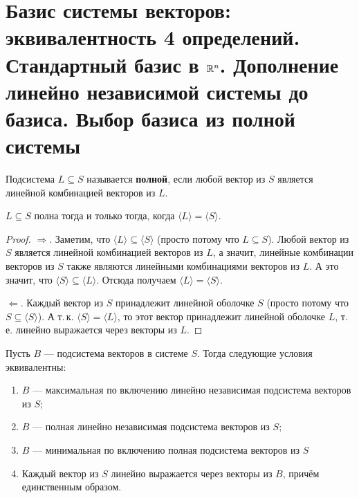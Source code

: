 \section{Базис системы векторов: эквивалентность 4 определений. Стандартный базис в $\mathbb{R}^n$. Дополнение линейно независимой системы до базиса. Выбор базиса из полной системы}

\begin{definition}
    Подсистема $L \subseteq S$ называется \textbf{полной}, если любой вектор из $S$ является линейной комбинацией векторов из $L$.
\end{definition}

\begin{statement}
    $L \subseteq S$ полна тогда и только тогда, когда $\langle L\rangle = \langle S\rangle$.
\end{statement}

\begin{proof}
    $\Rightarrow$. Заметим, что $\langle L\rangle \subseteq \langle S\rangle$ (просто потому что $L \subseteq S$). Любой вектор из $S$ является линейной комбинацией векторов из $L$, а значит, линейные комбинации векторов из $S$ также являются линейными комбинациями векторов из $L$. А это значит, что $\langle S\rangle \subseteq \langle L\rangle$. Отсюда получаем $\langle L\rangle = \langle S\rangle$.

    $\Leftarrow$. Каждый вектор из $S$ принадлежит линейной оболочке $S$ (просто потому что $S \subseteq \langle S\rangle$). А т.\,к. $\langle S\rangle = \langle L\rangle$, то этот вектор принадлежит линейной оболочке $L$, т.\,е. линейно выражается через векторы из $L$.
\end{proof}

\begin{theorem}
    Пусть $B$ --- подсистема векторов в системе $S$. Тогда следующие условия эквивалентны:
    \begin{enumerate}[nolistsep]
        \item $B$ --- максимальная по включению линейно независимая подсистема векторов из $S$;
        \item $B$ --- полная линейно независимая подсистема векторов из $S$;
        \item $B$ --- минимальная по включению полная подсистема векторов из $S$
        \item Каждый вектор из $S$ линейно выражается через векторы из $B$, причём единственным образом.
    \end{enumerate}
\end{theorem}

